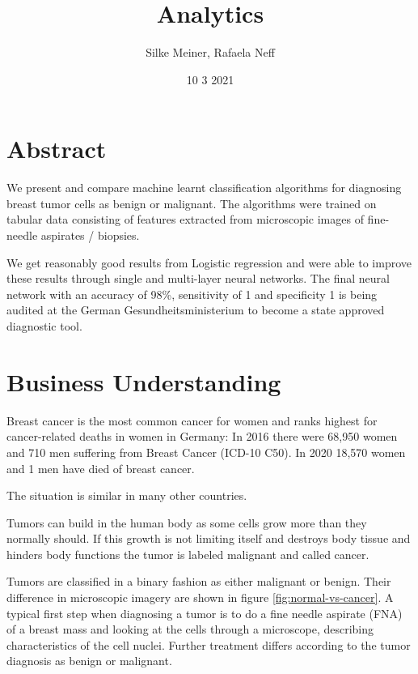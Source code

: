 \documentclass[]{article}
\title{Analytics}
\author{Silke Meiner, Rafaela Neff}
\date{10 3 2021}
\begin{document}
\maketitle

{
\setcounter{tocdepth}{2}
\tableofcontents
}
\section{Abstract}\label{abstract}

We present and compare machine learnt classification algorithms for
diagnosing breast tumor cells as benign or malignant. The algorithms
were trained on tabular data consisting of features extracted from
microscopic images of fine-needle aspirates / biopsies.

We get reasonably good results from Logistic regression and were able to
improve these results through single and multi-layer neural networks.
The final neural network with an accuracy of 98\%, sensitivity of 1 and
specificity 1 is being audited at the German Gesundheitsministerium to
become a state approved diagnostic tool.

\section{Business Understanding}\label{business-understanding}

Breast cancer is the most common cancer for women and ranks highest for
cancer-related deaths in women in Germany: In 2016 there were 68,950
women and 710 men suffering from Breast Cancer (ICD-10 C50). In 2020
18,570 women and 1 men have died of breast cancer.

The situation is similar in many other countries.

Tumors can build in the human body as some cells grow more than they
normally should. If this growth is not limiting itself and destroys body
tissue and hinders body functions the tumor is labeled malignant and
called cancer.

Tumors are classified in a binary fashion as either malignant or benign.
Their difference in microscopic imagery are shown in figure
\ref{fig:normal-vs-cancer}. A typical first step when diagnosing a tumor
is to do a fine needle aspirate (FNA) of a breast mass and looking at
the cells through a microscope, describing characteristics of the cell
nuclei. Further treatment differs according to the tumor diagnosis as
benign or malignant.
\end{document}
